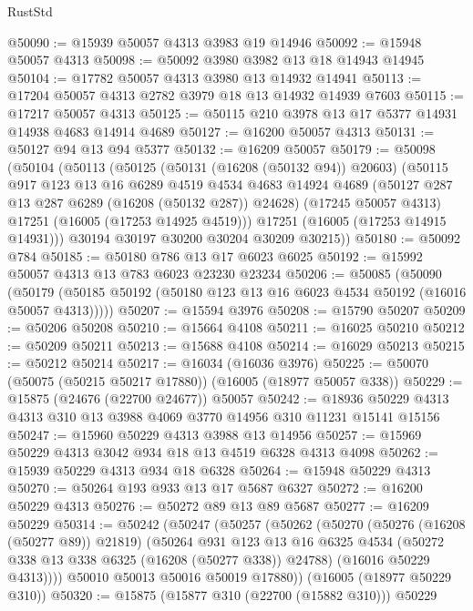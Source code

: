 \begin{lexlean}{RustStd}
\begin{coremodule}
@50090 := @15939 @50057 @4313 @3983 @19 @14946
@50092 := @15948 @50057 @4313
@50098 := @50092 @3980 @3982 @13 @18 @14943 @14945
@50104 := @17782 @50057 @4313 @3980 @13 @14932 @14941
@50113 := @17204 @50057 @4313 @2782 @3979 @18 @13 @14932 @14939 @7603
@50115 := @17217 @50057 @4313
@50125 := @50115 @210 @3978 @13 @17 @5377 @14931 @14938 @4683 @14914 @4689
@50127 := @16200 @50057 @4313
@50131 := @50127 @94 @13 @94 @5377
@50132 := @16209 @50057
@50179 := @50098
    (@50104
      (@50113
        (@50125
          (@50131 (@16208 (@50132 @94)) @20603)
          (@50115
            @917
            @123
            @13
            @16
            @6289
            @4519
            @4534
            @4683
            @14924
            @4689
            (@50127 @287 @13 @287 @6289 (@16208 (@50132 @287)) @24628)
            (@17245 @50057 @4313)
            @17251
            (@16005 (@17253 @14925 @4519)))
          @17251
          (@16005 (@17253 @14915 @14931)))
        @30194
        @30197
        @30200
        @30204
        @30209
        @30215))
@50180 := @50092 @784
@50185 := @50180 @786 @13 @17 @6023 @6025
@50192 := @15992 @50057 @4313 @13 @783 @6023 @23230 @23234
@50206 := @50085
    (@50090 (@50179 (@50185 @50192 (@50180 @123 @13 @16 @6023 @4534 @50192 (@16016 @50057 @4313)))))
@50207 := @15594 @3976
@50208 := @15790 @50207
@50209 := @50206 @50208
@50210 := @15664 @4108
@50211 := @16025 @50210
@50212 := @50209 @50211
@50213 := @15688 @4108
@50214 := @16029 @50213
@50215 := @50212 @50214
@50217 := @16034 (@16036 @3976)
@50225 := @50070 (@50075 (@50215 @50217 @17880)) (@16005 (@18977 @50057 @338))
@50229 := @15875 (@24676 (@22700 @24677)) @50057
@50242 := @18936 @50229 @4313 @4313 @310 @13 @3988 @4069 @3770 @14956 @310 @11231 @15141 @15156
@50247 := @15960 @50229 @4313 @3988 @13 @14956
@50257 := @15969 @50229 @4313 @3042 @934 @18 @13 @4519 @6328 @4313 @4098
@50262 := @15939 @50229 @4313 @934 @18 @6328
@50264 := @15948 @50229 @4313
@50270 := @50264 @193 @933 @13 @17 @5687 @6327
@50272 := @16200 @50229 @4313
@50276 := @50272 @89 @13 @89 @5687
@50277 := @16209 @50229
@50314 := @50242
    (@50247
      (@50257
        (@50262
          (@50270
            (@50276 (@16208 (@50277 @89)) @21819)
            (@50264
              @931
              @123
              @13
              @16
              @6325
              @4534
              (@50272 @338 @13 @338 @6325 (@16208 (@50277 @338)) @24788)
              (@16016 @50229 @4313))))
        @50010
        @50013
        @50016
        @50019
        @17880))
    (@16005 (@18977 @50229 @310))
@50320 := @15875 (@15877 @310 (@22700 (@15882 @310))) @50229

\end{coremodule}
\end{lexlean}
